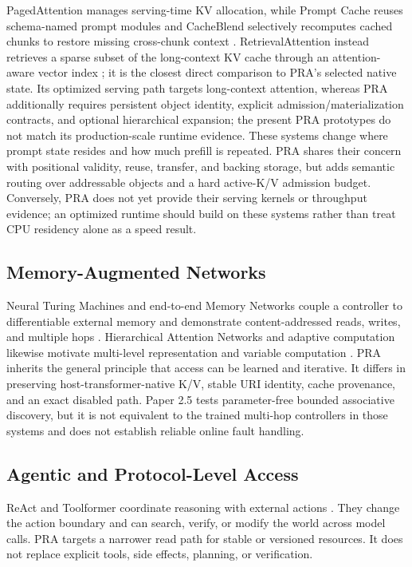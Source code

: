 \documentclass[11pt]{article}
\begin{document}
PagedAttention manages serving-time KV allocation, while Prompt Cache reuses schema-named prompt
modules and CacheBlend selectively recomputes cached chunks to restore missing cross-chunk
context \cite{kwon2023vllm,gim2023promptcache,yao2024cacheblend}. RetrievalAttention instead
retrieves a sparse subset of the long-context KV cache through an attention-aware vector index
\cite{liu2024retrievalattention}; it is the closest direct comparison to PRA's selected native
state. Its optimized serving path targets long-context attention, whereas PRA additionally
requires persistent object identity, explicit admission/materialization contracts, and optional
hierarchical expansion; the present PRA prototypes do not match its production-scale runtime
evidence. These systems change where
prompt state resides and how much prefill is repeated. PRA shares their concern with positional
validity, reuse, transfer, and backing storage, but adds semantic routing over addressable
objects and a hard active-K/V admission budget. Conversely, PRA does not yet provide their
serving kernels or throughput evidence; an optimized runtime should build on these systems
rather than treat CPU residency alone as a speed result.

\subsection{Memory-Augmented Networks}

Neural Turing Machines and end-to-end Memory Networks couple a controller to differentiable
external memory and demonstrate content-addressed reads, writes, and multiple hops
\cite{graves2014ntm,sukhbaatar2015memnn}. Hierarchical Attention Networks and adaptive computation
likewise motivate multi-level representation and variable computation
\cite{yang2016han,dehghani2019universal,graves2016adaptive}. PRA inherits the general principle
that access can be learned and iterative. It differs in preserving host-transformer-native K/V,
stable URI identity, cache provenance, and an exact disabled path. Paper 2.5 tests parameter-free
bounded associative discovery, but it is not equivalent to the trained multi-hop controllers in
those systems and does not establish reliable online fault handling.

\subsection{Agentic and Protocol-Level Access}

ReAct and Toolformer coordinate reasoning with external actions
\cite{yao2023react,schick2023toolformer}. They change the action boundary and can search, verify,
or modify the world across model calls. PRA targets a narrower read path for stable or versioned
resources. It does not replace explicit tools, side effects, planning, or verification.
\end{document}
